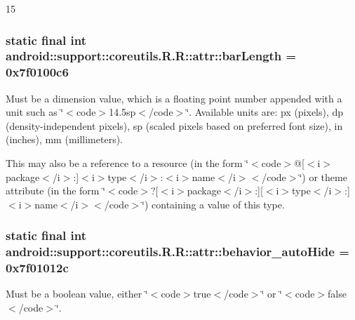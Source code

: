 15\hypertarget{classandroid_1_1support_1_1coreutils_1_1_r_1_1attr_640c96474609be7c58d8d11020777d7e}{
\subsubsection[{barLength}]{\setlength{\rightskip}{0pt plus 5cm}static final int android::support::coreutils.R.R::attr::barLength = 0x7f0100c6}}
\label{classandroid_1_1support_1_1coreutils_1_1_r_1_1attr_640c96474609be7c58d8d11020777d7e}


Must be a dimension value, which is a floating point number appended with a unit such as \char`\"{}$<$code$>$14.5sp$<$/code$>$\char`\"{}. Available units are: px (pixels), dp (density-independent pixels), sp (scaled pixels based on preferred font size), in (inches), mm (millimeters). 

This may also be a reference to a resource (in the form \char`\"{}$<$code$>$@\mbox{[}$<$i$>$package$<$/i$>$:\mbox{]}$<$i$>$type$<$/i$>$:$<$i$>$name$<$/i$>$$<$/code$>$\char`\"{}) or theme attribute (in the form \char`\"{}$<$code$>$?\mbox{[}$<$i$>$package$<$/i$>$:\mbox{]}\mbox{[}$<$i$>$type$<$/i$>$:\mbox{]}$<$i$>$name$<$/i$>$$<$/code$>$\char`\"{}) containing a value of this type. \hypertarget{classandroid_1_1support_1_1coreutils_1_1_r_1_1attr_d2d3c4e65587ef2977995149bb251bae}{
\subsubsection[{behavior\_\-autoHide}]{\setlength{\rightskip}{0pt plus 5cm}static final int android::support::coreutils.R.R::attr::behavior\_\-autoHide = 0x7f01012c}}
\label{classandroid_1_1support_1_1coreutils_1_1_r_1_1attr_d2d3c4e65587ef2977995149bb251bae}


Must be a boolean value, either \char`\"{}$<$code$>$true$<$/code$>$\char`\"{} or \char`\"{}$<$code$>$false$<$/code$>$\char`\"{}. 

